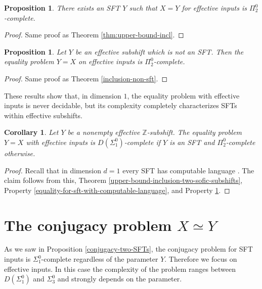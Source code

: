 \documentclass[a4paper]{article}
\newcommand{\Z}{\mathbb{Z}}
\newtheorem{proposition}[theorem]{Proposition}
\newtheorem{corollary}[theorem]{Corollary}
\theoremstyle{definition}
\begin{document}
\begin{proposition}
    There exists an SFT $Y$ such that $X=Y$ for effective inputs is $\Pi^0_2$-complete.
\end{proposition}

\begin{proof}
    Same proof as Theorem \ref{thm:upper-bound-incl}.
\end{proof}

\begin{proposition}\label{equality-non-sft}
    Let $Y$ be an effective subshift which is not an SFT. Then the equality problem $Y = X$ on effective inputs is $\Pi_2^0$-complete.
\end{proposition}

\begin{proof}
Same proof as Theorem \ref{inclusion-non-sft}.
\end{proof}

These results show that, in dimension $1$, the equality problem with effective inputs is never decidable, but its complexity completely characterizes SFTs within effective subshifts. 
\begin{corollary}
Let $Y$ be a nonempty effective $\Z$-subshift. The equality problem $Y=X$ with effective inputs is $D(\Sigma_1^0)$-complete if $Y$ is an SFT and $\Pi_2^0$-complete otherwise.
\end{corollary}
\begin{proof}
    Recall that in dimension $d=1$ every SFT has computable language \cite{lind_introduction_1995}. The claim follows from this, Theorem \ref{upper-bound-inclusion-two-sofic-subshifts}, Property \ref{equality-for-sft-with-computable-language}, and Property \ref{equality-non-sft}.
\end{proof}

\section{The conjugacy problem $X\simeq Y$}\label{sec:conjugacy}

As we saw in Proposition \ref{conjugacy-two-SFTs}, the conjugacy problem for SFT inputs is $\Sigma_1^0$-complete regardless of the parameter $Y$. Therefore we focus on effective inputs. In this case the complexity of the problem ranges between $D(\Sigma_1^0)$ and $\Sigma_3^0$ and strongly depends on the parameter.
\end{document}
